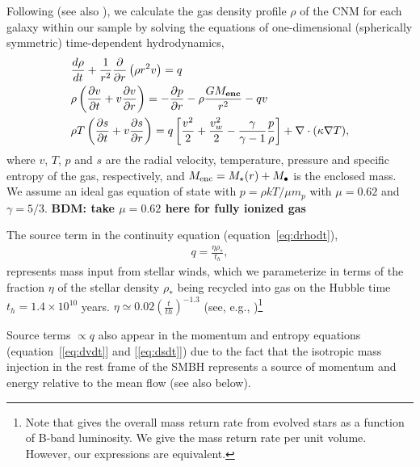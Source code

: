 \documentclass[usenatbib,fleqn]{mn2e}
\newcommand{\dxdy}[2]{\frac{d #1}{d #2} }
\newcommand{\drhodt}{\dxdy{\rho}{t}}
\newcommand{\ke}{\frac{v^2}{2}}
\newcommand{\kew}{\frac{v_w^2}{2}}
\newcommand{\gammaf}{\frac{\gamma}{\gamma-1}}
\newcommand{\cs}{\frac{p}{\rho}}
\newcommand{\rhostar}{\rho_*}
\newcommand{\Mbh}[1][]{M_{\bullet#1}}
\renewcommand{\th}{t_h}
\begin{document}
Following \citet{Quataert:2004a} (see also \citealt{HolzerAxford:1970a,De-ColleGuillochon+:2012a,ShcherbakovWong+:2014a}), we calculate the gas density profile $\rho$ of the CNM for each galaxy within our sample by solving the equations of one-dimensional (spherically symmetric) time-dependent hydrodynamics,
\begin{align}
  &\drhodt+\frac{1}{r^2}\frac{\partial}{\partial r}\left(\rho r^2 v\right)=q \label{eq:drhodt}\\
  &\rho \left(\frac{\partial v}{\partial t} + v\frac{\partial
      v}{\partial r}\right) =-\frac{\partial p}{\partial r}- \rho\frac{GM_{\bf enc}}{r^{2}} -q v \label{eq:dvdt}\\
  &\rho T\left(\frac{\partial s}{\partial t} + v\frac{\partial
      s}{\partial r}\right)=q\left[\ke+\kew-\gammaf \cs \right] +\nabla\cdot(\kappa \nabla T)
, 
\label{eq:dsdt}
\end{align}
where $v$, $T$, $p$ and $s$ are the radial velocity, temperature,
pressure and specific entropy of the gas, respectively, and $M_{\rm enc} = M_{\star}(r) + \Mbh$ is the
enclosed mass.  We assume an ideal gas equation of state with $p =
\rho kT/\mu m_p$ with $\mu = 0.62$  and $\gamma = 5/3$. {\bf BDM: take $\mu = 0.62$ here for fully ionized gas}

The source term in the continuity equation (equation~\ref{eq:drhodt}),
\begin{align}
  q=\frac{\eta \rhostar}{\th},
\label{eq:q}
\end{align}
represents mass input from stellar winds, which we parameterize in
terms of the fraction $\eta$ of the stellar density $\rhostar$ being
recycled into gas on the Hubble time $\th = 1.4 \times 10^{10}$
years. $\eta\simeq 0.02 \left(\frac{t}{th}\right)^{-1.3}$ 
(see, e.g., \citealt{Ciotti+91})\footnote{Note that 
\citealt{Ciotti+91} gives the overall mass return rate from evolved
stars as a function of B-band luminosity. We give the mass return rate
per unit volume. However, our expressions are equivalent.} 

Source terms $\propto q$ also appear in the momentum and entropy
equations (equation~[\ref{eq:dvdt}] and [\ref{eq:dsdt}]) due to the fact
that the isotropic mass injection in the rest frame of the SMBH
represents a source of momentum and energy relative to the mean flow (see also below).  
\end{document}
